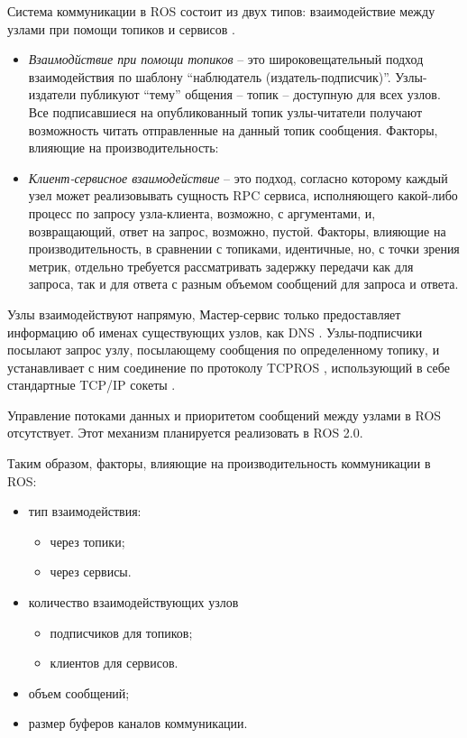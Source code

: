 Система коммуникации в ROS состоит из двух типов: взаимодействие между узлами при помощи топиков и сервисов \cite{o2014gentle}.

\begin{itemize}[noitemsep]
	\item \textit{Взаимодйствие при помощи топиков} -- это широковещательный подход взаимодействия по шаблону \enquote{наблюдатель (издатель-подписчик)}. Узлы-издатели публикуют \enquote{тему} общения -- топик -- доступную для всех узлов. Все подписавшиеся на опубликованный топик узлы-читатели получают возможность читать отправленные на данный топик сообщения. Факторы, влияющие на производительность:

	\item \textit{Клиент-сервисное взаимодействие} -- это подход, согласно которому каждый узел может реализовывать сущность RPC сервиса, исполняющего какой-либо процесс по запросу узла-клиента, возможно, с аргументами, и, возвращающий, ответ на запрос, возможно, пустой. Факторы, влияющие на производительность, в сравнении с топиками, идентичные, но, с точки зрения метрик, отдельно требуется рассматривать задержку передачи как для запроса, так и для ответа с разным объемом сообщений для запроса и ответа.
\end{itemize}

Узлы взаимодействуют напрямую, Мастер-сервис только предоставляет информацию об именах существующих узлов, как DNS . Узлы-подписчики посылают запрос узлу, посылающему сообщения по определенному топику, и устанавливает с ним соединение по протоколу TCPROS \cite{ros-tcpros}, использующий в себе стандартные TCP/IP сокеты \cite{ros-concepts}.

Управление потоками данных и приоритетом сообщений между узлами в ROS отсутствует. Этот механизм планируется реализовать в ROS 2.0.

Таким образом, факторы, влияющие на производительность коммуникации в ROS:
\begin{itemize}[noitemsep]
	\item тип взаимодействия:
	\begin{itemize}[noitemsep]
		\item через топики;
		\item через сервисы.
	\end{itemize}
	\item количество взаимодействующих узлов
	\begin{itemize}[noitemsep]
		\item подписчиков для топиков;
		\item клиентов для сервисов.
	\end{itemize}
	\item объем сообщений;
	\item размер буферов каналов коммуникации.
\end{itemize}